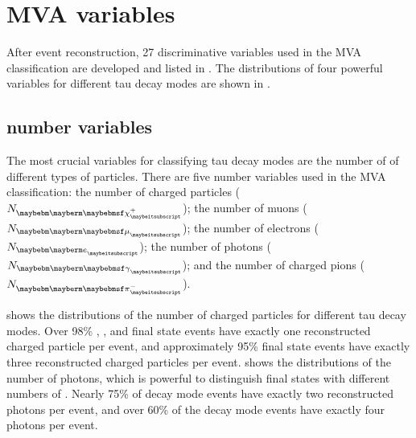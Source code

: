 \section{MVA variables}
\label{sec:tauVar}

After event reconstruction,  27 discriminative variables used in the MVA  classification  are  developed and listed in . The distributions of four powerful variables for different tau decay modes are shown in .


\subsection{\PFOs number variables}

The most crucial variables for classifying tau decay modes  are the number of \PFOs of different types of particles. There are five \PFOs number variables used in the MVA classification: the number of charged particles (${N}_{\charge}$); the number of muons (${N}_{\Pmu}$); the number of electrons (${N}_{\Pe}$); the number of photons (${N}_{\Pgg}$); and the number of charged pions (${N}_{\Pgpm}$).

 shows the distributions of the number of charged particles for different tau decay modes. Over 98\% \decayElectronShort, \decayMuonShort, and \decayPionShort final state events have exactly one reconstructed charged particle  per event, and approximately 95\% \decayAiPionShort final state events have exactly three reconstructed charged particles  per event.  shows the distributions of the number of photons, which is powerful to distinguish final states with different numbers of \Ppizero. Nearly 75\% of  \decayRhoShort decay mode events have exactly two reconstructed photons per event, and over 60\% of the \decayAiPhotonShort decay mode events have exactly four photons per event.


